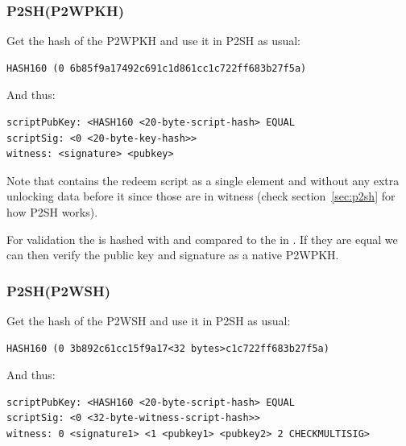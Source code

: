 \subsubsection*{P2SH(P2WPKH)}
Get the hash of the P2WPKH  and use it in P2SH as usual:

\begin{emphbox}
\begin{lstlisting}[style=Pseudomath]
HASH160 (0 6b85f9a17492c691c1d861cc1c722ff683b27f5a)
\end{lstlisting}
\end{emphbox}

And thus:

\begin{emphbox}
\begin{lstlisting}[style=Pseudomath]
scriptPubKey: <HASH160 <20-byte-script-hash> EQUAL
scriptSig: <0 <20-byte-key-hash>>
witness: <signature> <pubkey>
\end{lstlisting}
\end{emphbox}

Note that  contains the redeem script as a single element and without any extra unlocking data before it since those are in witness (check section~\ref{sec:p2sh} for how P2SH works). 

For validation the  is hashed with  and compared to the  in . If they are equal we can then verify the public key and signature as a native P2WPKH.


\subsubsection*{P2SH(P2WSH)}
Get the hash of the P2WSH  and use it in P2SH as usual:

\begin{emphbox}
\begin{lstlisting}[style=Pseudomath]
HASH160 (0 3b892c61cc15f9a17<32 bytes>c1c722ff683b27f5a)
\end{lstlisting}
\end{emphbox}

And thus:

\begin{emphbox}
\begin{lstlisting}[style=Pseudomath]
scriptPubKey: <HASH160 <20-byte-script-hash> EQUAL
scriptSig: <0 <32-byte-witness-script-hash>>
witness: 0 <signature1> <1 <pubkey1> <pubkey2> 2 CHECKMULTISIG>
\end{lstlisting}
\end{emphbox}

